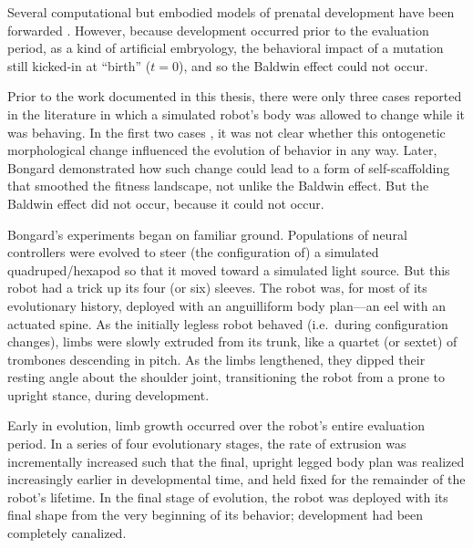 Several computational but embodied models of prenatal development have been forwarded
\cite{dellaert1994toward,dellaert1996developmental,Eggenberger97,Bongard01,miller2004evolving,basanta2008evolution,doursat2009organically,doursat2014growing,joachimczak2016artificial}.
However, because development occurred prior to the evaluation period,
as a kind of artificial embryology,
the behavioral impact of a mutation 
still kicked-in at ``birth'' ($t=0$), and so the Baldwin effect could not occur.


Prior to the work documented in this thesis, there were only three cases reported in the literature in which a simulated robot's body was allowed to change while it was behaving. 
In the first two cases \cite{ventrella1998designing,komosinski2003framsticks}, it was not clear whether this ontogenetic morphological change influenced the evolution of behavior in any way. 
Later, Bongard \cite{bongard2011morphological} demonstrated how such change could lead to a form of self-scaffolding that smoothed the fitness landscape,
not unlike the Baldwin effect.
But the Baldwin effect did not occur, because it could not occur.

Bongard's experiments began on familiar ground.
Populations of neural controllers were evolved to
steer (the configuration of) a simulated quadruped/hexapod so that it moved toward a simulated light source.
But this robot had a trick up its four (or six) sleeves.
The robot was, for most of its evolutionary history, deployed with an anguilliform body plan---an eel with an actuated spine.
As the initially legless robot behaved (i.e.~during configuration changes),
limbs were slowly extruded from its trunk,
like a quartet (or sextet) of trombones descending in pitch.
As the limbs lengthened, they dipped their resting angle about the shoulder joint, transitioning the robot from a prone to upright stance, during development.

Early in evolution, limb growth occurred over the robot's entire evaluation period.
In a series of four evolutionary stages,
the rate of extrusion was incrementally increased
such that the final, upright legged body plan was realized increasingly earlier in developmental time, and held fixed for the remainder of the robot's lifetime.
In the final stage of evolution,
the robot was deployed with its final shape from the very beginning of its behavior; development had been completely canalized.


